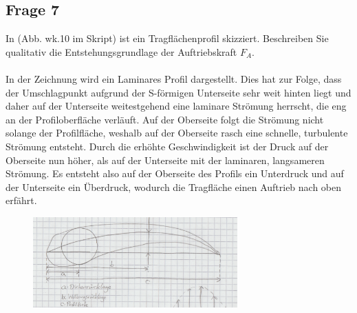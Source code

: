 \documentclass[a4paper,10pt]{scrartcl}
\begin{document}
		\subsection{Frage 7}
			In (Abb. wk.10 im Skript) ist ein Tragflächenprofil skizziert. Beschreiben Sie qualitativ die Entstehungsgrundlage
			der Auftriebskraft \(F_{A}\).\\
			\\
			In der Zeichnung wird ein Laminares Profil dargestellt. Dies hat zur Folge, dass der Umschlagpunkt aufgrund der S-förmigen Unterseite sehr weit hinten liegt und daher auf der Unterseite weitestgehend eine laminare Strömung herrscht, die eng an der Profiloberfläche verläuft. Auf der Oberseite folgt die Strömung nicht solange der Profilfläche, weshalb auf der Oberseite rasch eine schnelle, turbulente Strömung entsteht. Durch die erhöhte Geschwindigkeit ist der Druck auf der Oberseite nun höher, als auf der Unterseite mit der laminaren, langsameren Strömung. Es entsteht also auf der Oberseite des Profils ein Unterdruck und auf der Unterseite ein Überdruck, wodurch die Tragfläche einen Auftrieb nach oben erfährt.
			\FloatBarrier
\begin{figure}[h]		
		\centering
\includegraphics[width=0.7\textwidth]{./Bilder/wk1}

\end{figure}
\FloatBarrier
	
\end{document}
